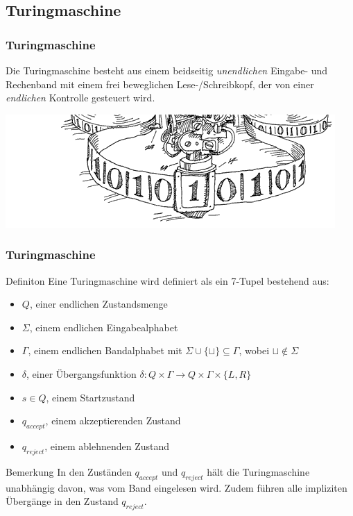 \subsection{Turingmaschine}
\begin{frame}
	\frametitle{Turingmaschine}
	Die Turingmaschine besteht aus einem beidseitig \emph{unendlichen} Eingabe- und Rechenband
	mit einem frei beweglichen Lese-/Schreibkopf, der von einer \emph{endlichen} Kontrolle gesteuert wird. 
	\begin{center}
		\vspace{1cm}
		\hspace{-12mm}
		\includegraphics[scale=0.5]{images/tmaschine.png}
	\end{center}
\end{frame}
\begin{frame}
\frametitle{Turingmaschine}
\begin{block}{Definiton}
Eine Turingmaschine wird definiert als ein 7-Tupel bestehend aus:
 \begin{itemize}
 \item $Q$, einer endlichen Zustandsmenge
 \item $\Sigma$, einem endlichen Eingabealphabet
 \item $\Gamma$, einem endlichen Bandalphabet mit $\Sigma \cup\{\sqcup\} \subseteq \Gamma$, wobei $\sqcup \notin \Sigma$
 \item $\delta$, einer Übergangsfunktion $\delta: Q\times\Gamma \rightarrow Q\times\Gamma\times\{L, R\}$
 \item $s \in Q$, einem Startzustand
 \item $q_{accept}$, einem akzeptierenden Zustand
 \item $q_{reject}$, einem ablehnenden Zustand
 \end{itemize}
\end{block}
\begin{block}{Bemerkung}
 In den Zuständen $q_{accept}$ und $q_{reject}$ hält die Turingmaschine unabhängig davon, was vom Band eingelesen wird. Zudem führen alle impliziten Übergänge in den Zustand $q_{reject}$.
\end{block}
\end{frame}

